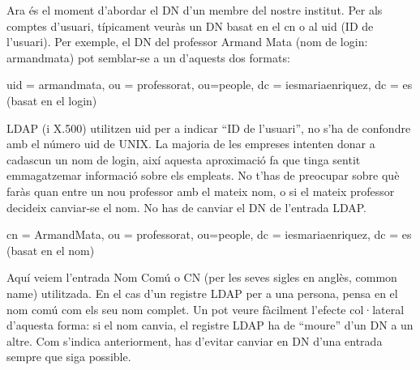 \documentclass[
  12 pt,
  a4paper,
]{article}
\begin{document}
Ara és el moment d'abordar el DN d'un membre del nostre institut. Per
als comptes d'usuari, típicament veuràs un DN basat en el cn o al uid
(ID de l'usuari). Per exemple, el DN del professor Armand Mata (nom de
login: armandmata) pot semblar-se a un d'aquests dos formats:

uid = armandmata, ou = professorat, ou=people, dc = iesmariaenriquez, dc
= es (basat en el login)

LDAP (i X.500) utilitzen uid per a indicar ``ID de l'usuari'', no s'ha
de confondre amb el número uid de UNIX. La majoria de les empreses
intenten donar a cadascun un nom de login, així aquesta aproximació fa
que tinga sentit emmagatzemar informació sobre els empleats. No t'has de
preocupar sobre què faràs quan entre un nou professor amb el mateix nom,
o si el mateix professor decideix canviar-se el nom. No has de canviar
el DN de l'entrada LDAP.

cn = ArmandMata, ou = professorat, ou=people, dc = iesmariaenriquez, dc
= es (basat en el nom)

Aquí veiem l'entrada Nom Comú o CN (per les seves sigles en anglès,
common name) utilitzada. En el cas d'un registre LDAP per a una persona,
pensa en el nom comú com els seu nom complet. Un pot veure fàcilment
l'efecte col·lateral d'aquesta forma: si el nom canvia, el registre LDAP
ha de ``moure'' d'un DN a un altre. Com s'indica anteriorment, has
d'evitar canviar en DN d'una entrada sempre que siga possible.
\end{document}
